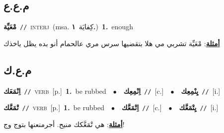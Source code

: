 \documentclass[10pt,a4paper,twoside]{article} %
\begin{document}
\begin{multicols}{2}
\vspace{-3mm}
\subsection*{\color{blue}\foreignlanguage{arabic}{م.ع.ع}\color{blue}{}} 

{\setlength\topsep{0pt}\textbf{\foreignlanguage{arabic}{مْعَيِّة}}\ {\color{gray}\texttt{//}\color{black}}\ \textsc{interj}\ \color{gray}(msa. \foreignlanguage{arabic}{كِفايَة}~\foreignlanguage{arabic}{\textbf{١.}})\color{black}\ \textbf{1.}~enough\  \begin{flushright}\color{gray}\foreignlanguage{arabic}{\textbf{\underline{\foreignlanguage{arabic}{أمثلة}}}: مْعَيِّة تشربي مي هلا بتقضيها سرس مري عالحمام أنو بده يظل ياخذك}\end{flushright}\color{black}} \vspace{2mm}

\vspace{-3mm}
\subsection*{\color{blue}\foreignlanguage{arabic}{م.ع.ك}\color{blue}{}} 

{\setlength\topsep{0pt}\textbf{\foreignlanguage{arabic}{اِنْمَعَك}}\ {\color{gray}\texttt{//}\color{black}}\ \textsc{verb}\ [p.]\ \textbf{1.}~be rubbed\ \ $\bullet$\ \ \setlength\topsep{0pt}\textbf{\foreignlanguage{arabic}{اِنْمِعِك}}\ {\color{gray}\texttt{//}\color{black}}\ [c.]\ \ $\bullet$\ \ \setlength\topsep{0pt}\textbf{\foreignlanguage{arabic}{يِنْمِعِك}}\ {\color{gray}\texttt{//}\color{black}}\ [i.]\ } \vspace{2mm}

{\setlength\topsep{0pt}\textbf{\foreignlanguage{arabic}{تْمَعَّك}}\ {\color{gray}\texttt{//}\color{black}}\ \textsc{verb}\ [p.]\ \textbf{1.}~be rubbed\ \ $\bullet$\ \ \setlength\topsep{0pt}\textbf{\foreignlanguage{arabic}{اِتْمَعَّك}}\ {\color{gray}\texttt{//}\color{black}}\ [c.]\ \ $\bullet$\ \ \setlength\topsep{0pt}\textbf{\foreignlanguage{arabic}{يِتْمَعَّك}}\ {\color{gray}\texttt{//}\color{black}}\ [i.]\  \begin{flushright}\color{gray}\foreignlanguage{arabic}{\textbf{\underline{\foreignlanguage{arabic}{أمثلة}}}: هي تْمَعَّكك منيح. أجرمنعنها بتوج وج!}\end{flushright}\color{black}} \vspace{2mm}


\end{multicols}
\end{document}
